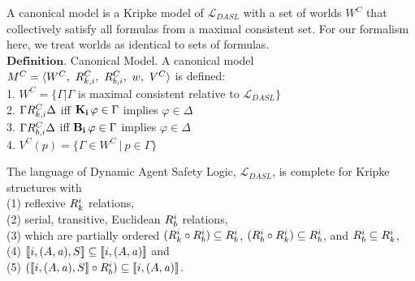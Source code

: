 A canonical model is a Kripke model of $\mathcal{L}_{DASL}$ with a set of worlds $W^C$ that collectively satisfy all formulas from a maximal consistent set. For our formalism here, we treat worlds as identical to sets of formulas.
\\
$\mathbf{Definition}$. Canonical Model. A canonical model $M^C = \langle W^C,\ R_{k,i}^C,\ R_{b,i}^C,\ w,\ V^C\rangle$ is defined:\\
1. $W^C = \{\Gamma | \Gamma$ is maximal consistent relative to $\mathcal{L}_{DASL} \}$\\
2. $\Gamma R_{k,i}^C \Delta$ iff $\mathbf{K}_{\mathbf{i}}\,\varphi \in \Gamma$ implies $\varphi \in \Delta$\\
3. $\Gamma R_{b,i}^C \Delta$ iff $\mathbf{B}_{\mathbf{i}}\,\varphi \in \Gamma$ implies $\varphi \in \Delta$\\
4. $V^C(p) = \{\Gamma \in W^C\ |\ p \in \Gamma\}$\\


\begin{tcolorbox}
	\begin{theorem}[Completeness]
		The language of Dynamic Agent Safety Logic, $\mathcal{L}_{DASL}$, is complete for Kripke structures with\\ (1) reflexive $R_{k}^i$ relations,\\ (2) serial, transitive, Euclidean $R_{b}^i$ relations, \\(3) which are partially ordered $(R_{k}^i \circ R_{b}^i) \subseteq R_{b}^i$, $(R_{b}^i \circ R_{k}^i) \subseteq R_{b}^i$, and $R_{b}^i \subseteq R_{k}^i$, \\(4) $\llbracket i,(A,\mathit{a}),S\rrbracket \subseteq \llbracket i,(A,\mathit{a})\rrbracket$%
		and\\ (5) $(\llbracket i,(A,\mathit{a}),S\rrbracket \circ R_{b}^i) \subseteq \llbracket i, (A,\mathit{a})\rrbracket$.
	\end{theorem}
\end{tcolorbox}

